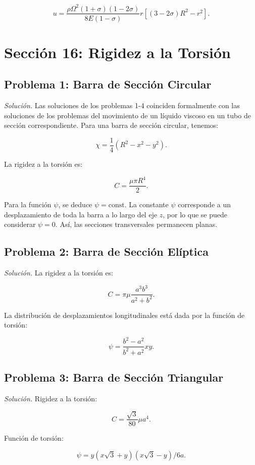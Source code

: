 \documentclass{article}
\begin{document}
$$
u = \frac{\rho \Omega^2 (1+\sigma)(1-2\sigma)}{8E(1-\sigma)} r [(3-2\sigma)R^2 - r^2].
$$

\section*{Sección 16: Rigidez a la Torsión}

\subsection*{Problema 1: Barra de Sección Circular}

\textit{Solución.} Las soluciones de los problemas 1-4 coinciden formalmente con las soluciones de los problemas del movimiento de un líquido viscoso en un tubo de sección correspondiente. Para una barra de sección circular, tenemos:

$$
\chi = \frac{1}{4} (R^2 - x^2 - y^2).
$$

La rigidez a la torsión es:

$$
C = \frac{\mu \pi R^4}{2}.
$$

Para la función $\psi$, se deduce $\psi = \text{const}$. La constante $\psi$ corresponde a un desplazamiento de toda la barra a lo largo del eje $z$, por lo que se puede considerar $\psi = 0$. Así, las secciones transversales permanecen planas.

\subsection*{Problema 2: Barra de Sección Elíptica}

\textit{Solución.} La rigidez a la torsión es:

$$
C = \pi \mu \frac{a^3 b^3}{a^2 + b^2}.
$$

La distribución de desplazamientos longitudinales está dada por la función de torsión:

$$
\psi = \frac{b^2 - a^2}{b^2 + a^2} xy.
$$

\subsection*{Problema 3: Barra de Sección Triangular}

\textit{Solución.} Rigidez a la torsión:

$$
C = \frac{\sqrt{3}}{80} \mu a^4.
$$

Función de torsión:

$$
\psi = y(x\sqrt{3} + y)(x\sqrt{3} - y)/6a.
$$
\end{document}
